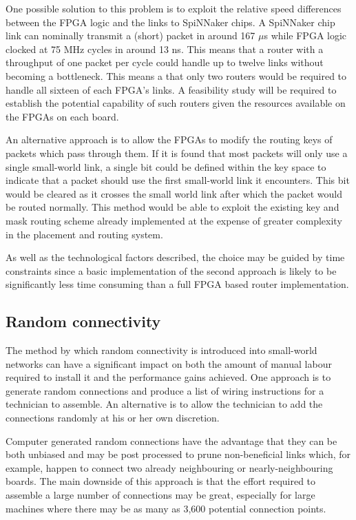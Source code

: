 			One possible solution to this problem is to exploit the relative speed
			differences between the FPGA logic and the links to SpiNNaker chips. A
			SpiNNaker chip link can nominally transmit a (short) packet in around 167
			$\mu$s while FPGA logic clocked at 75 MHz cycles in around 13 ns. This
			means that a router with a throughput of one packet per cycle could handle
			up to twelve links without becoming a bottleneck. This means a that only
			two routers would be required to handle all sixteen of each FPGA's links.
			A feasibility study will be required to establish the potential capability
			of such routers given the resources available on the FPGAs on each board.
			
			An alternative approach is to allow the FPGAs to modify the routing keys
			of packets which pass through them. If it is found that most packets will
			only use a single small-world link, a single bit could be defined within
			the key space to indicate that a packet should use the first small-world
			link it encounters. This bit would be cleared as it crosses the small
			world link after which the packet would be routed normally. This method
			would be able to exploit the existing key and mask routing scheme already
			implemented at the expense of greater complexity in the placement and
			routing system.
			
			As well as the technological factors described, the choice may be guided
			by time constraints since a basic implementation of the second approach is
			likely to be significantly less time consuming than a full FPGA based
			router implementation.
		
		\subsection{Random connectivity}
			
			The method by which random connectivity is introduced into small-world
			networks can have a significant impact on both the amount of manual labour
			required to install it and the performance gains achieved. One approach is
			to generate random connections and produce a list of wiring instructions
			for a technician to assemble. An alternative is to allow the technician to
			add the connections randomly at his or her own discretion.
			
			Computer generated random connections have the advantage that they can be
			both unbiased and may be post processed to prune non-beneficial links
			which, for example, happen to connect two already neighbouring or
			nearly-neighbouring boards. The main downside of this approach is that the
			effort required to assemble a large number of connections may be great,
			especially for large machines where there may be as many as 3,600
			potential connection points.
			
